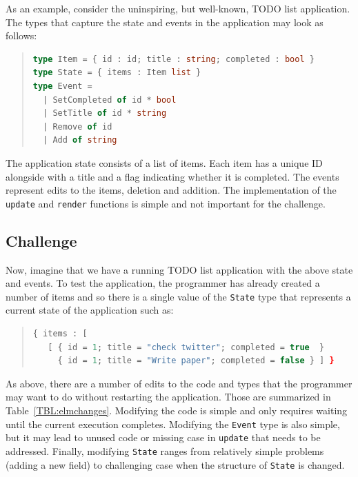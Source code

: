 \documentclass[english,submission]{programming}
\begin{document}
As an example, consider the uninspiring, but well-known, TODO list application. The types that capture the state and events in the application may look as follows:

\begin{quote}
\begin{lstlisting}[language=ml,morekeywords={on}]
type Item = { id : id; title : string; completed : bool }
type State = { items : Item list }
type Event =
  | SetCompleted of id * bool
  | SetTitle of id * string
  | Remove of id
  | Add of string
\end{lstlisting}
\end{quote}

The application state consists of a list of items. Each item has a unique ID alongside with a title and a flag indicating whether it is completed. The events represent edits to the items, deletion and addition. The implementation of the \texttt{update} and \texttt{render} functions is simple and not important for the challenge.

\subsection{Challenge}
Now, imagine that we have a running TODO list application with the above state and events. To test the application, the programmer has already created a number of items and so there is a single value of the \texttt{State} type that represents a current state of the application such as:

\begin{quote}
\begin{lstlisting}[language=ml,morekeywords={on}]
{ items : [
   [ { id = 1; title = "check twitter"; completed = true  }
     { id = 1; title = "Write paper"; completed = false } ] }
\end{lstlisting}
\end{quote}

As above, there are a number of edits to the code and types that the programmer may want to do without restarting the application. Those are summarized in Table~\ref{TBL:elmchanges}. Modifying the code is simple and only requires waiting until the current execution completes. Modifying the \texttt{Event} type is also simple, but it may lead to unused code or missing case in \texttt{update} that needs to be addressed. Finally, modifying \texttt{State} ranges from relatively simple problems (adding a new field) to challenging case when the structure of \texttt{State} is changed.
\end{document}
